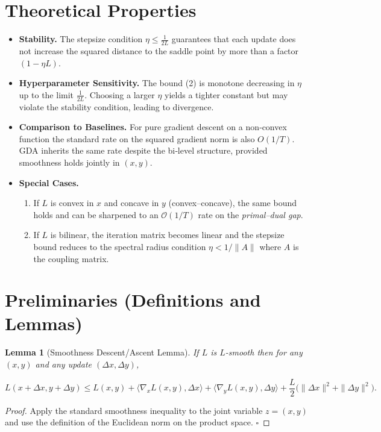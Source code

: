 \documentclass{article}
\newtheorem{lemma}{Lemma}
\begin{document}
\section*{Theoretical Properties}
\begin{itemize}
\item \textbf{Stability.} The stepsize condition \(\eta\le\frac{1}{2L}\) guarantees that each update does not increase the squared distance to the saddle point by more than a factor \((1-\eta L)\). 

\item \textbf{Hyperparameter Sensitivity.} The bound (2) is monotone decreasing in \(\eta\) up to the limit \(\frac{1}{2L}\). Choosing a larger \(\eta\) yields a tighter constant but may violate the stability condition, leading to divergence.

\item \textbf{Comparison to Baselines.} For pure gradient descent on a non‑convex function the standard rate on the squared gradient norm is also \(O(1/T)\). GDA inherits the same rate despite the bi‑level structure, provided smoothness holds jointly in \((x,y)\).

\item \textbf{Special Cases.}
\begin{enumerate}
\item If \(L\) is convex in \(x\) and concave in \(y\) (convex–concave), the same bound holds and can be sharpened to an \(\mathcal{O}(1/T)\) rate on the \emph{primal–dual gap}.
\item If \(L\) is bilinear, the iteration matrix becomes linear and the stepsize bound reduces to the spectral radius condition \(\eta<1/\|A\|\) where \(A\) is the coupling matrix.
\end{enumerate}
\end{itemize}

\section*{Preliminaries (Definitions and Lemmas)}
\begin{lemma}[Smoothness Descent/Ascent Lemma]\label{lem:smooth}
If \(L\) is \(L\)-smooth then for any \((x,y)\) and any update \((\Delta x,\Delta y)\),

\[
L(x+\Delta x,y+\Delta y)
\le
L(x,y)+\langle\nabla_x L(x,y),\Delta x\rangle
+\langle\nabla_y L(x,y),\Delta y\rangle
+\frac{L}{2}\big(\|\Delta x\|^2+\|\Delta y\|^2\big).
\tag{4}
\]
\end{lemma}
\begin{proof}
Apply the standard smoothness inequality to the joint variable \(z=(x,y)\) and use the definition of the Euclidean norm on the product space. \(\square\)
\end{proof}
\end{document}
